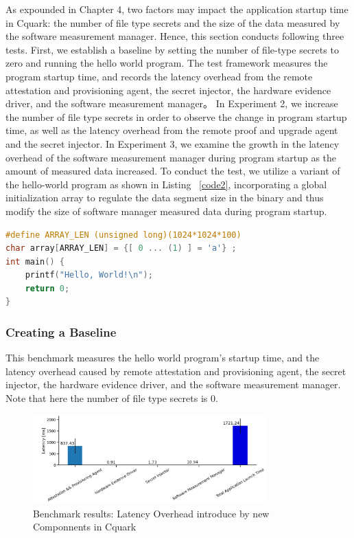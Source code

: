 As expounded in Chapter 4, two factors may impact the application startup time in Cquark: the number of file type secrets and the size of the data measured by the software measurement manager. Hence, this section conducts following three tests. First, we establish a baseline by setting the 
number of file-type secrets to zero and running the hello world program. The test framework measures the program startup time, and records the latency overhead from the remote attestation and provisioning agent, the secret injector, the hardware evidence driver, and the software measurement manager。  
In Experiment 2, we increase the number of file type secrets in order to observe the change in program startup time, as well as the latency overhead from the remote proof and upgrade agent and the secret injector. In Experiment 3, we examine the growth in the latency overhead of the software 
measurement manager during program startup as the amount of measured data increased. To conduct the test, we utilize a variant of the hello-world program as shown in Listing ~\ref{code2}, incorporating a global initialization array to regulate the data segment size in the binary and thus modify the size 
of software manager measured data during program startup.

\begin{lstlisting}[language=C,frame=single,caption=Hello World Program Variant,label=code2]
#define ARRAY_LEN (unsigned long)(1024*1024*100)    
char array[ARRAY_LEN] = {[ 0 ... (1) ] = 'a'} ;
int main() {     
    printf("Hello, World!\n");
    return 0;
}
\end{lstlisting}


\subsubsection{Creating a Baseline}

This benchmark measures the hello world program's startup time, and the latency overhead caused by remote attestation and provisioning agent, the secret injector, the hardware evidence driver, and the software measurement manager. Note that here the number of file type secrets is 0.

\begin{figure}[H]
    \centering
    \includegraphics[width=0.8\textwidth]{images/application_start_microtest_baseline_time_overhead_each_cmp.PNG}
    \caption[Benchmark results: Latency Overhead introduce by new Componnents in Cquark]{Benchmark results: Latency Overhead introduce by new Componnents in Cquark}
    \label{fig:application_start_microtest_baseline_time_overhead_each_cmp}
\end{figure}

